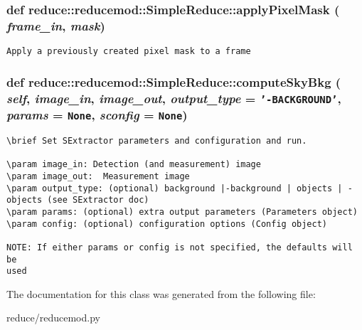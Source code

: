 \subsubsection{\setlength{\rightskip}{0pt plus 5cm}def reduce::reducemod::Simple\-Reduce::apply\-Pixel\-Mask ( {\em frame\_\-in},  {\em mask})}\label{classreduce_1_1reducemod_1_1SimpleReduce_06007b7186f5487ba80e833d6677effd}




\footnotesize\begin{verbatim}
Apply a previously created pixel mask to a frame
\end{verbatim}
\normalsize
\subsubsection{\setlength{\rightskip}{0pt plus 5cm}def reduce::reducemod::Simple\-Reduce::compute\-Sky\-Bkg ( {\em self},  {\em image\_\-in},  {\em image\_\-out},  {\em output\_\-type} = {\tt '-BACKGROUND'},  {\em params} = {\tt None},  {\em sconfig} = {\tt None})}\label{classreduce_1_1reducemod_1_1SimpleReduce_9865ba3fbc75f39adced8c844130535c}




\footnotesize\begin{verbatim}
\brief Set SExtractor parameters and configuration and run.

\param image_in: Detection (and measurement) image
\param image_out:  Measurement image
\param output_type: (optional) background |-background | objects | -objects (see SExtractor doc)
\param params: (optional) extra output parameters (Parameters object)
\param config: (optional) configuration options (Config object)

NOTE: If either params or config is not specified, the defaults will be
used
\end{verbatim}
\normalsize
 

The documentation for this class was generated from the following file:\begin{CompactItemize}
\item 
reduce/reducemod.py\end{CompactItemize}
